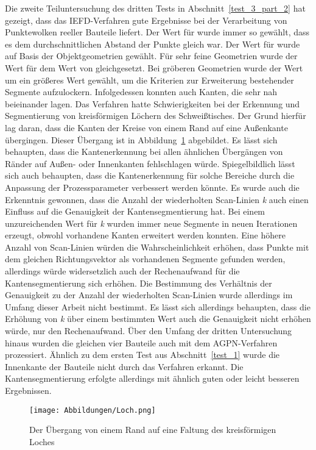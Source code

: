 Die zweite Teiluntersuchung des dritten Tests in Abschnitt~\ref{test_3_part_2} hat gezeigt, dass das IEFD-Verfahren gute Ergebnisse bei der Verarbeitung von Punktewolken reeller Bauteile liefert. Der Wert für \distthresha wurde immer so gewählt, dass es dem durchschnittlichen Abstand der Punkte gleich war. Der Wert für \distthreshb wurde auf Basis der Objektgeometrien gewählt. Für sehr feine Geometrien wurde der Wert für \distthreshb dem Wert von \distthresha gleichgesetzt. Bei gröberen Geometrien wurde der Wert um ein größeres Wert gewählt, um die Kriterien zur Erweiterung bestehender Segmente aufzulockern. Infolgedessen konnten auch Kanten, die sehr nah beieinander lagen. Das Verfahren hatte  Schwierigkeiten bei der Erkennung und Segmentierung von kreisförmigen Löchern des Schweißtisches. Der Grund hierfür lag daran, dass die Kanten der Kreise von einem Rand auf eine Außenkante übergingen. Dieser Übergang ist in Abbildung~\ref{fig: Loch} abgebildet. Es lässt sich behaupten, dass die Kantenerkennung bei allen ähnlichen Übergängen von Ränder auf Außen- oder Innenkanten fehlschlagen würde. Spiegelbildlich lässt sich auch behaupten, dass die Kantenerkennung für solche Bereiche durch die Anpassung der Prozessparameter verbessert werden könnte. Es wurde auch die Erkenntnis gewonnen, dass die Anzahl der wiederholten Scan-Linien \textit{k} auch einen Einfluss auf die Genauigkeit der Kantensegmentierung hat. Bei einem unzureichenden Wert für \textit{k} wurden immer neue Segmente in neuen Iterationen erzeugt, obwohl vorhandene Kanten erweitert werden konnten. Eine höhere Anzahl von Scan-Linien würden die Wahrscheinlichkeit erhöhen, dass Punkte mit dem gleichen Richtungsvektor als vorhandenen Segmente gefunden werden, allerdings würde widersetzlich auch der Rechenaufwand für die Kantensegmentierung sich erhöhen. Die Bestimmung des Verhältnis der Genauigkeit zu der Anzahl der wiederholten Scan-Linien wurde allerdings im Umfang dieser Arbeit nicht bestimmt. Es lässt sich allerdings behaupten, dass die Erhöhung von \textit{k} über einem bestimmten Wert auch die Genauigkeit nicht erhöhen würde, nur den Rechenaufwand. Über den Umfang der dritten Untersuchung hinaus wurden die gleichen vier Bauteile auch mit dem AGPN-Verfahren prozessiert. Ähnlich zu dem ersten Test aus Abschnitt~\ref{test_1} wurde die Innenkante der Bauteile nicht durch das Verfahren erkannt. Die Kantensegmentierung erfolgte allerdings mit ähnlich guten oder leicht besseren Ergebnissen. 

\begin{figure}[t]
	\texttt{[image: Abbildungen/Loch.png]}
	\centering
	\caption[Übergangsregion zweier Kanten]{Der Übergang von einem Rand auf eine Faltung des kreisförmigen Loches}
	\label{fig: Loch}
\end{figure}

